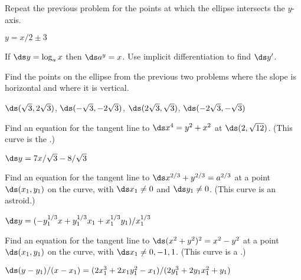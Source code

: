 \begin{enumialphparenastyle}
\begin{ex} 
Repeat the previous problem for the points at which the
 ellipse intersects the $y$-axis.
\begin{sol}
	$y=x/2\pm3$
\end{sol}
\end{ex}

\begin{ex} 
	If $\ds y=\log_a x$ then $\ds a^y=x$. Use implicit
	differentiation to find $\ds y'$.
\end{ex}

\begin{ex} 
Find the points on the ellipse from the previous two problems
 where the slope is horizontal and where it is vertical.
\begin{sol}
	$\ds (\sqrt3,2\sqrt3)$, $\ds (-\sqrt3,-2\sqrt3)$, $\ds (2\sqrt3,\sqrt3)$,
$\ds (-2\sqrt3,-\sqrt3)$ 
\end{sol}
\end{ex}

\begin{ex} 
Find an equation for the tangent line to 
$\ds x^4 = y^2 + x^2$ at $\ds (2, \sqrt{12})$. 
(This curve is the .)
\begin{sol}
	$\ds y=7x/\sqrt3-8/\sqrt3$
\end{sol}
\end{ex}

\begin{ex} 
Find an equation for the tangent line to $\ds x^{2/3} +
y^{2/3} = a^{2/3}$ at a point $\ds (x_1 ,y_1)$ on the curve, 
with $\ds x_1 \neq 0$ and $\ds y_1 \neq 0$. (This curve is an {\dfont astroid}.)
\begin{sol}
	$\ds y=(-y_1^{1/3}x+y_1^{1/3}x_1+x_1^{1/3}y_1)/x_1^{1/3}$
\end{sol}
\end{ex}

\begin{ex} 
Find an equation for the tangent line to $\ds (x^2 +y^2 )^2 =x^2
-y^2$ at a point $\ds (x_1 , y_1)$ on the curve, with $\ds x_1 \neq 0, -1, 1$.
(This curve is a .)
\begin{sol}
	$\ds (y-y_1)/(x-x_1)=(2x_1^3+2x_1y_1^2-x_1)/(2y_1^3+2y_1x_1^2+y_1)$
\end{sol}
\end{ex}


\end{enumialphparenastyle}
